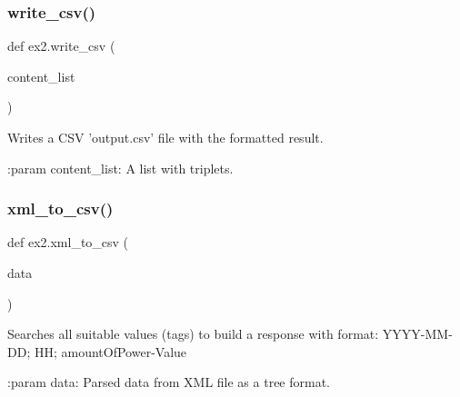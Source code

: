 \subsubsection{\texorpdfstring{write\+\_\+csv()}{write\_csv()}}
{\footnotesize\ttfamily def ex2.\+write\+\_\+csv (\begin{DoxyParamCaption}\item[{}]{content\+\_\+list }\end{DoxyParamCaption})}

\begin{DoxyVerb}Writes a CSV 'output.csv' file with the formatted result.

:param content_list: A list with triplets.
\end{DoxyVerb}
 \mbox{\label{namespaceex2_a0141c6ec7022817f6ff1fafcf5084bb4}} 
\subsubsection{\texorpdfstring{xml\+\_\+to\+\_\+csv()}{xml\_to\_csv()}}
{\footnotesize\ttfamily def ex2.\+xml\+\_\+to\+\_\+csv (\begin{DoxyParamCaption}\item[{}]{data }\end{DoxyParamCaption})}

\begin{DoxyVerb}Searches all suitable values (tags) to build a response with format:
YYYY-MM-DD; HH; amountOfPower-Value

:param data: Parsed data from XML file as a tree format.
\end{DoxyVerb}
 
